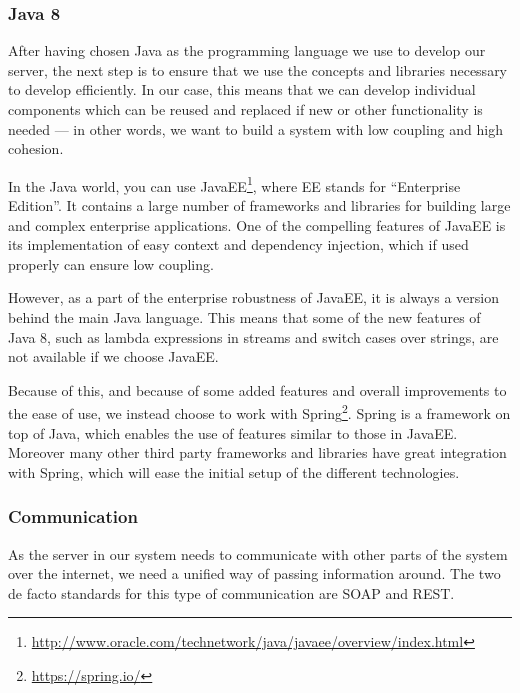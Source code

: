\subsubsection{Java 8}
After having chosen Java as the programming language we use to develop our server, the next step is to ensure that we use the concepts and libraries necessary to develop efficiently.
In our case, this means that we can develop individual components which can be reused and replaced if new or other functionality is needed --- in other words, we want to build a system with low coupling and high cohesion.

In the Java world, you can use JavaEE\footnote{\url{http://www.oracle.com/technetwork/java/javaee/overview/index.html}}, where EE stands for ``Enterprise Edition''.
It contains a large number of frameworks and libraries for building large and complex enterprise applications.
One of the compelling features of JavaEE is its implementation of easy context and dependency injection, which if used properly can ensure low coupling.

However, as a part of the enterprise robustness of JavaEE, it is always a version behind the main Java language.
This means that some of the new features of Java 8, such as lambda expressions in streams and switch cases over strings, are not available if we choose JavaEE.

Because of this, and because of some added features and overall improvements to the ease of use, we instead choose to work with Spring\footnote{\url{https://spring.io/}}.
Spring is a framework on top of Java, which enables the use of features similar to those in JavaEE.
Moreover many other third party frameworks and libraries have great integration with Spring, which will ease the initial setup of the different technologies.

\subsubsection{Communication}
As the server in our system needs to communicate with other parts of the system over the internet, we need a unified way of passing information around.
The two de facto standards for this type of communication are SOAP and REST.

